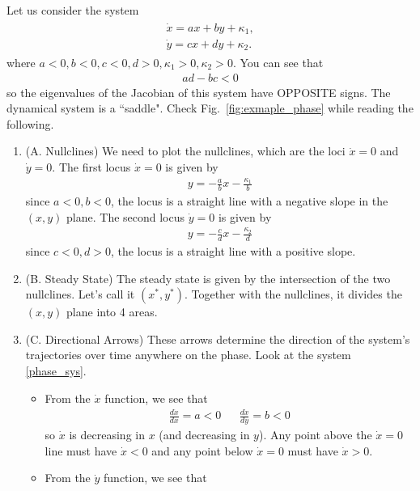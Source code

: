 \documentclass[11pt,a4paper]{book}
\theoremstyle{definition}\newtheorem{definition}{Definition}
\theoremstyle{definition}\newtheorem{fact}{Fact}
\theoremstyle{definition}\newtheorem{remark}{Remark}
\theoremstyle{definition}\newtheorem{ex}{Ex.}
\theoremstyle{definition}\newtheorem{project}{Project}
\theoremstyle{definition}\newtheorem{problem}{Problem}
\theoremstyle{definition}\newtheorem{example}{Example}
\numberwithin{theorem}{section}
\numberwithin{corollary}{chapter}
\numberwithin{assumption}{chapter}
\numberwithin{definition}{chapter}
\numberwithin{prop}{chapter}
\numberwithin{notation}{chapter}
\numberwithin{problem}{chapter}
\numberwithin{example}{chapter}
\numberwithin{fact}{chapter}
\numberwithin{ex}{chapter}
\begin{document}
	Let us consider the system
	\begin{align}
		\begin{matrix}
			\dot{x} = a x + b y + \kappa_1, \\
		\dot{y} = c x + d y + \kappa_2. 
		\end{matrix} \label{phase_sys}
	\end{align}
	where $a < 0, b < 0, c < 0, d > 0, \kappa_1 > 0, \kappa_2 > 0$. You can see that
	\begin{align*}
		ad - bc < 0
	\end{align*}
	so the eigenvalues of the Jacobian of this system have OPPOSITE signs. The dynamical system is a ``saddle". Check Fig.~\ref{fig:exmaple_phase} while reading the following.
	\begin{enumerate}
		\item (A. Nullclines) We need to plot the nullclines, which are the loci $\dot{x}=0$ and $\dot{y}=0$. The first locus $\dot{x}=0$ is given by
		\begin{align*}
			y = - \frac{a}{b} x - \frac{\kappa_1}{b}
		\end{align*}
		since $a<0,b<0$, the locus is a straight line with a negative slope in the $(x,y)$ plane. The second locus $\dot{y} = 0$ is given by
		\begin{align*}
			y = - \frac{c}{d} x - \frac{\kappa_2}{d}
		\end{align*}
		since $c<0, d>0$, the locus is a straight line with a positive slope.
		\item (B. Steady State) The steady state is given by the intersection of the two nullclines. Let's call it $(x^*, y^*)$. Together with the nullclines, it divides the $(x,y)$ plane into 4 areas.
		\item (C. Directional Arrows) These arrows determine the direction of the system’s trajectories over time anywhere on the phase. Look at the system \eqref{phase_sys}.
		\begin{itemize}
			\item From the $\dot{x}$ function, we see that
			\begin{align*}
				\frac{d \dot{x}}{dx} = a < 0 && \frac{d \dot{x}}{dy} = b < 0  
			\end{align*}
			so $\dot{x}$ is decreasing in $x$ (and decreasing in $y$). Any point above the $\dot{x} = 0$ line must have $\dot{x} < 0$ and any point below $\dot{x}=0$ must have $\dot{x} > 0$. 
			\item From the $\dot{y}$ function, we see that
			\begin{align*}

\end{align*}
\end{itemize}
\end{enumerate}
\end{document}
